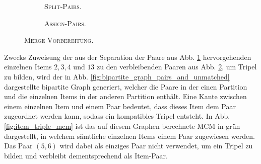 \begin{figure}[H]
\centering
\begin{subfigure}[b]{\textwidth}
\centering
{}
\caption{\textsc{Split-Pairs}.}
\label{fig:split_pairs}
\end{subfigure}
\begin{subfigure}[b]{\textwidth}
\centering
{}
\caption{\textsc{Assign-Pairs}.}
\label{fig:assign_pairs}
\end{subfigure}
\caption{\textsc{Merge Vorbereitung}.}
\label{fig:pre_merge_step}
\end{figure}

Zwecks Zuweisung der aus der Separation der Paare aus Abb. \ref{fig:split_pairs} hervorgehenden einzelnen
Items $2, 3, 4$ und $13$ zu den verbleibenden Paaren aus Abb. \ref{fig:assign_pairs}, um Tripel zu bilden, wird der in Abb.
\ref{fig:bipartite_graph_pairs_and_unmatched} dargestellte bipartite Graph generiert, welcher die Paare in der einen Partition
und die einzelnen Items in der anderen Partition enthält. Eine Kante zwischen einem einzelnen Item und einem Paar bedeutet,
dass dieses Item dem Paar zugeordnet werden kann, sodass ein kompatibles Tripel entsteht.
In Abb. \ref{fig:item_triple_mcm} ist das auf diesem Graphen berechnete \textsc{MCM} in grün dargestellt, in welchem
sämtliche einzelnen Items einem Paar zugewiesen werden. Das Paar $(5, 6)$ wird dabei als einziges Paar nicht verwendet,
um ein Tripel zu bilden und verbleibt dementsprechend als Item-Paar.

